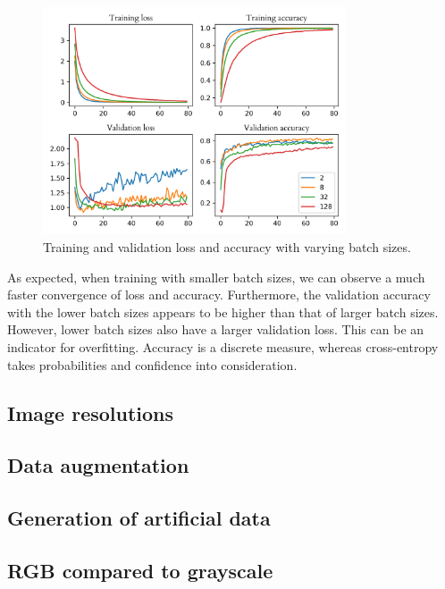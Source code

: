 \documentclass{l4proj}
\begin{document}
\begin{figure}[ht]
  \centering
  \includegraphics[width=0.8\textwidth]{images/evaluation/batch_size/history.png}
  \caption{Training and validation loss and accuracy with varying batch sizes.}
  \label{fig:batch_size}
\end{figure}

As expected, when training with smaller batch sizes, we can observe a much faster convergence of loss and accuracy. Furthermore, the validation accuracy with the lower batch sizes appears to be higher than that of larger batch sizes. However, lower batch sizes also have a larger validation loss. This can be an indicator for overfitting. Accuracy is a discrete measure, whereas cross-entropy takes probabilities and confidence into consideration.

\subsection{Image resolutions}

\subsection{Data augmentation}

\subsection{Generation of artificial data}


\subsection{RGB compared to grayscale}



\end{document}
